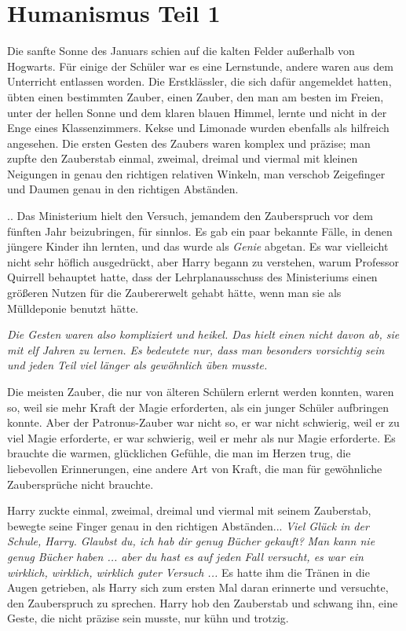 \chapter{Humanismus Teil 1}

Die sanfte Sonne des Januars schien auf die kalten Felder außerhalb von
Hogwarts. Für einige der Schüler war es eine Lernstunde, andere waren aus dem
Unterricht entlassen worden. Die Erstklässler, die sich dafür angemeldet hatten,
übten einen bestimmten Zauber, einen Zauber, den man am besten im Freien, unter
der hellen Sonne und dem klaren blauen Himmel, lernte und nicht in der Enge
eines Klassenzimmers. Kekse und Limonade wurden ebenfalls als hilfreich
angesehen. Die ersten Gesten des Zaubers waren komplex und präzise; man zupfte
den Zauberstab einmal, zweimal, dreimal und viermal mit kleinen Neigungen in
genau den richtigen relativen Winkeln, man verschob Zeigefinger und Daumen genau
in den richtigen Abständen.

.. Das Ministerium hielt den Versuch, jemandem den Zauberspruch vor dem fünften
Jahr beizubringen, für sinnlos. Es gab ein paar bekannte Fälle, in denen jüngere
Kinder ihn lernten, und das wurde als \glqq{}\emph{Genie}\grqq{} abgetan. Es war
vielleicht nicht sehr höflich ausgedrückt, aber Harry begann zu verstehen, warum
Professor Quirrell behauptet hatte, dass der Lehrplanausschuss des Ministeriums
einen größeren Nutzen für die Zaubererwelt gehabt hätte, wenn man sie als
Mülldeponie benutzt hätte.

\emph{Die Gesten waren also kompliziert und heikel. Das hielt einen nicht davon
ab, sie mit elf Jahren zu lernen. Es bedeutete nur, dass man besonders
vorsichtig sein und jeden Teil viel länger als gewöhnlich üben musste.}

Die meisten Zauber, die nur von älteren Schülern erlernt werden konnten, waren
so, weil sie mehr Kraft der Magie erforderten, als ein junger Schüler aufbringen
konnte. Aber der Patronus-Zauber war nicht so, er war nicht schwierig, weil er
zu viel Magie erforderte, er war schwierig, weil er mehr als nur Magie
erforderte. Es brauchte die warmen, glücklichen Gefühle, die man im Herzen trug,
die liebevollen Erinnerungen, eine andere Art von Kraft, die man für gewöhnliche
Zaubersprüche nicht brauchte.

Harry zuckte einmal, zweimal, dreimal und viermal mit seinem Zauberstab, bewegte
seine Finger genau in den richtigen Abständen... \glqq{}\emph{Viel Glück in der
Schule, Harry. Glaubst du, ich hab dir genug Bücher gekauft?}\grqq{} \glqq
\emph{Man kann nie genug Bücher haben ... aber du hast es auf jeden Fall
versucht, es war ein wirklich, wirklich, wirklich guter Versuch ...\grqq{}} Es
hatte ihm die Tränen in die Augen getrieben, als Harry sich zum ersten Mal daran
erinnerte und versuchte, den Zauberspruch zu sprechen. Harry hob den Zauberstab
und schwang ihn, eine Geste, die nicht präzise sein musste, nur kühn und
trotzig.

